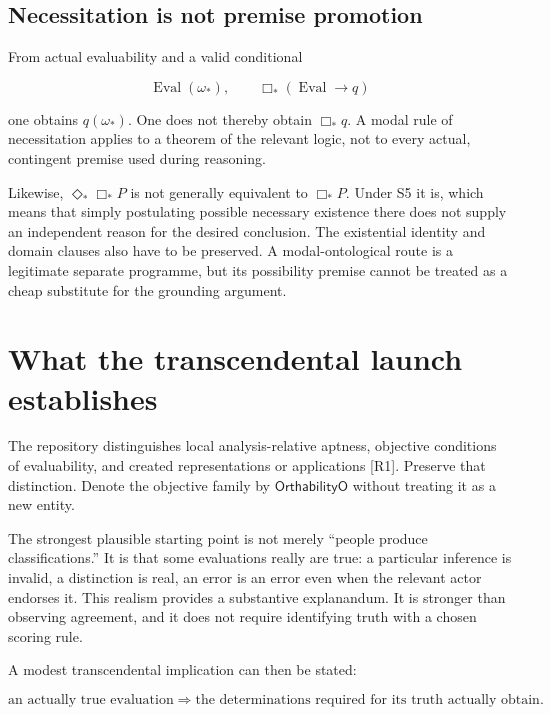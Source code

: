 \documentclass[11pt,a4paper]{article}
\begin{document}
\subsection{Necessitation is not premise
promotion}\label{necessitation-is-not-premise-promotion}

From actual evaluability and a valid conditional

\nopagebreak[4]

\[
\operatorname{Eval}(\omega_*) ,\qquad
\Box_*(\operatorname{Eval}\to q)
\]

one obtains \(q(\omega_*)\). One does not thereby obtain \(\Box_*q\). A
modal rule of necessitation applies to a theorem of the relevant logic,
not to every actual, contingent premise used during reasoning.

Likewise, \(\Diamond_*\Box_*P\) is not generally equivalent to
\(\Box_*P\). Under S5 it is, which means that simply postulating
possible necessary existence there does not supply an independent reason
for the desired conclusion. The existential identity and domain clauses
also have to be preserved. A modal-ontological route is a legitimate
separate programme, but its possibility premise cannot be treated as a
cheap substitute for the grounding argument.

\section{What the transcendental launch
establishes}\label{what-the-transcendental-launch-establishes}

The repository distinguishes local analysis-relative aptness, objective
conditions of evaluability, and created representations or applications
{[}R1{]}. Preserve that distinction. Denote the objective family by
\(\mathsf{OrthabilityO}\) without treating it as a new entity.

The strongest plausible starting point is not merely ``people produce
classifications.'' It is that some evaluations really are true: a
particular inference is invalid, a distinction is real, an error is an
error even when the relevant actor endorses it. This realism provides a
substantive explanandum. It is stronger than observing agreement, and it
does not require identifying truth with a chosen scoring rule.

A modest transcendental implication can then be stated:

\nopagebreak[4]

\[
\text{an actually true evaluation}
\Longrightarrow
\text{the determinations required for its truth actually obtain}.
\]
\end{document}
